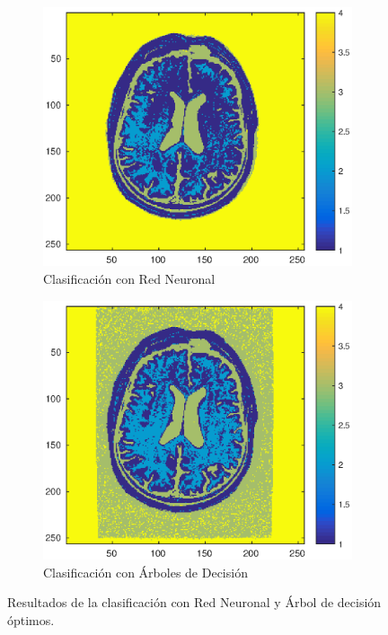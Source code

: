 \documentclass[11pt]{article} %
\begin{document}
\begin{figure}[h]
	\centering
	\begin{subfigure}[b]{0.435\textwidth}
		\includegraphics[width=\textwidth]{../4_NEW_IMAGE/NN_clasified.eps}
		\caption[]{\small Clasificación con Red Neuronal}
		\label{fig:new:nn}
	\end{subfigure}
	\quad
	\begin{subfigure}[b]{0.435\textwidth}
		\includegraphics[width=\textwidth]{../4_NEW_IMAGE/Tree_clasified.eps}
		\caption[]{\small Clasificación con Árboles de Decisión}
		\label{fig:new:tree}
	\end{subfigure}
	\caption{Resultados de la clasificación con Red Neuronal y Árbol de decisión óptimos.}
	\label{fig:new}
\end{figure}
\end{document}
